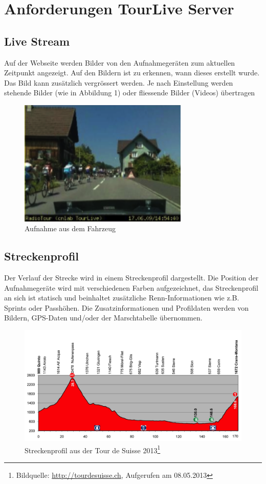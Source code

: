 \section{Anforderungen TourLive Server}
\label{sec:tourliveusecase}
\subsection{Live Stream}
Auf der Webseite werden Bilder von den Aufnahmegeräten zum aktuellen Zeitpunkt angezeigt. Auf den Bildern ist zu erkennen, wann dieses erstellt wurde. Das Bild kann zusätzlich vergrössert werden. Je nach Einstellung werden stehende Bilder (wie in Abbildung 1) oder fliessende Bilder (Videos) übertragen
\begin{figure}[H]
	\centering
	\includegraphics[height=60mm]{images/tourliveaufnahme.png}
	\caption{Aufnahme aus dem Fahrzeug}
\end{figure}

\subsection{Streckenprofil}
Der Verlauf der Strecke wird in einem Streckenprofil dargestellt. Die Position der Aufnahmegeräte wird mit verschiedenen Farben aufgezeichnet, das Streckenprofil an sich ist statisch und beinhaltet zusätzliche Renn-Informationen wie z.B. Sprints oder Passhöhen. Die Zusatzinformationen und Profildaten werden von Bildern, GPS-Daten und/oder der Marschtabelle übernommen.
\begin{figure}[H]
	\centering
	\includegraphics[width=130mm]{images/streckenprofil.jpg}
	\caption{Streckenprofil aus der Tour de Suisse 2013\footnote{Bildquelle: \url{http://tourdesuisse.ch}, Aufgerufen am 08.05.2013}}
\end{figure}

